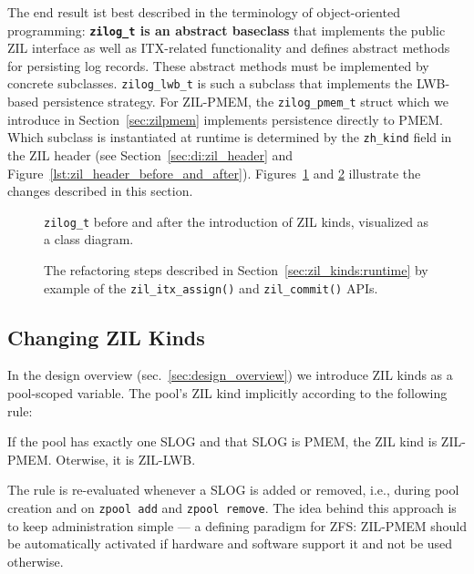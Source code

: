 \documentclass[12pt,a4paper,twoside]{book}
\begin{document}
The end result ist best described in the terminology of object-oriented programming:
\textbf{\lstinline{zilog_t} is an abstract baseclass} that implements the public ZIL interface as well as ITX-related functionality and defines abstract methods for persisting log records.
These abstract methods must be implemented by concrete subclasses.
\lstinline{zilog_lwb_t} is such a subclass that implements the LWB-based persistence strategy.
For ZIL-PMEM, the \lstinline{zilog_pmem_t} struct which we introduce in Section~\ref{sec:zilpmem} implements persistence directly to PMEM.
Which subclass is instantiated at runtime is determined by the \lstinline{zh_kind} field in the ZIL header (see Section~\ref{sec:di:zil_header} and Figure~\ref{lst:zil_header_before_and_after}).
Figures~\ref{fig:zilog_splitup_class_diagram} and \ref{fig:zilog_splitup_example_code} illustrate the changes described in this section.

\begin{figure}
\missingfigure[figheight=10cm]{}
\caption{\lstinline{zilog_t} before and after the introduction of ZIL kinds, visualized as a class diagram.}
\label{fig:zilog_splitup_class_diagram}
\end{figure}

\begin{figure}
\missingfigure[figheight=20cm]{}
\caption{The refactoring steps described in Section~\ref{sec:zil_kinds:runtime} by example of the \lstinline{zil_itx_assign()} and \lstinline{zil_commit()} APIs.}
\label{fig:zilog_splitup_example_code}
\end{figure}

\subsection{Changing ZIL Kinds}\label{sec:zil_kinds:change}
In the design overview (sec.~\ref{sec:design_overview}) we introduce ZIL kinds as a pool-scoped variable.
The pool's ZIL kind implicitly according to the following rule:
\begin{displayquote}
If the pool has exactly one SLOG and that SLOG is PMEM, the ZIL kind is ZIL-PMEM. Oterwise, it is ZIL-LWB.
\end{displayquote}
The rule is re-evaluated whenever a SLOG is added or removed, i.e., during pool creation and on \texttt{zpool add} and \texttt{zpool remove}.
The idea behind this approach is to keep administration simple --- a defining paradigm for ZFS:
ZIL-PMEM should be automatically activated if hardware and software support it and not be used otherwise.
\end{document}
